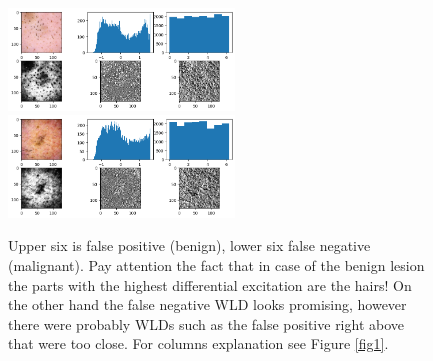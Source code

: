 \documentclass[a4paper,10pt,twocolumn]{article}
\begin{document}
\begin{figure}[H]
       \begin{center}
              \includegraphics[width=6cm]{false_positive_overview}
              \includegraphics[width=6cm]{false_negative_overview}
       \end{center}
       \caption{Upper six is false positive (benign), lower six false negative (malignant). Pay attention the fact that in case of the benign lesion the parts with the highest differential excitation are the hairs! On the other hand the false negative WLD looks promising, however there were probably WLDs such as the false positive right above that were too close. For columns explanation see Figure \ref{fig1}.}
       \label{fig8}
\end{figure}
% 
\end{document}
